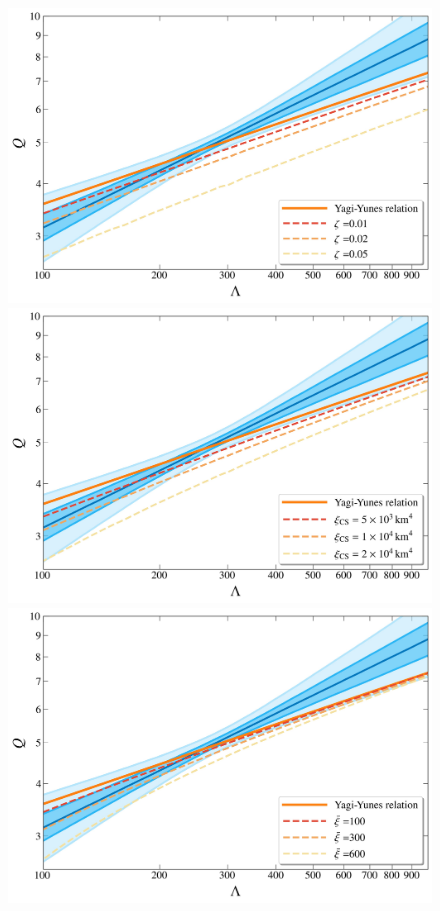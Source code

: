 \documentclass[a4paper,11pt]{article}
\begin{document}
\begin{figure}[htbp]
    \centering
    \begin{minipage}{0.48\linewidth}
        \includegraphics[width=\linewidth]{CS_zeta_AP4_2d.pdf}
    \end{minipage}
    \hfill
    \begin{minipage}{0.48\linewidth}
        \includegraphics[width=\linewidth]{CS_xi_cs_AP4_2d.pdf}
    \end{minipage}
    \vspace{3mm}
    \begin{minipage}{0.48\linewidth}
        \includegraphics[width=\linewidth]{CS_xi_bar_AP4_2d.pdf}

\end{minipage}
\end{figure}
\end{document}
